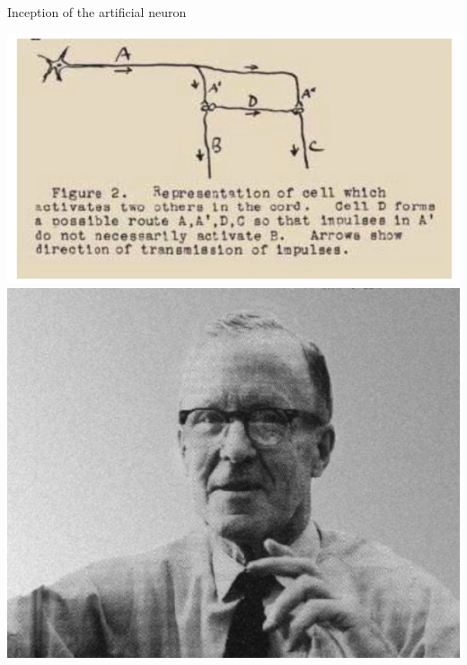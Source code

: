 \documentclass{beamer}
\begin{document}
\begin{frame}{Inception of the artificial neuron}
\begin{itemize}
\begin{center}
\includegraphics[scale=0.25]{pics/hebb_synapsis.png}
\includegraphics[scale=0.15]{pics/Donald Hebb.jpg}
\end{center}
\end{itemize}
\end{frame}
\end{document}

